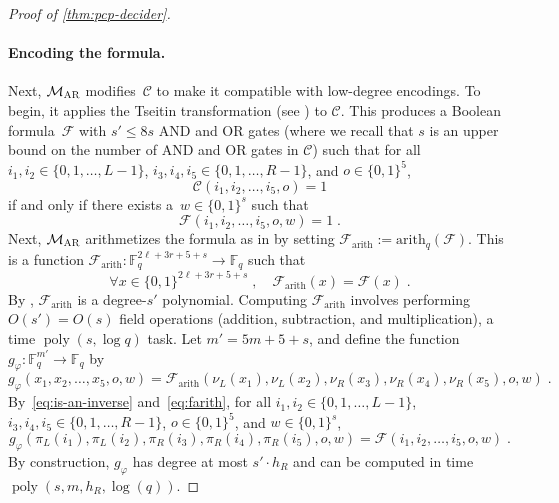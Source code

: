 \documentclass[11pt]{article}
\theoremstyle{definition}
\newcommand{\F}{\ensuremath{\mathbb{F}}}
\DeclareMathOperator{\poly}{poly}
\newcommand{\gamestyle}[1]{\ensuremath{\textsc{#1}}\xspace}
\newcommand{\ar}{\gamestyle{AR}}
\newcommand{\circuit}{\mathcal{C}}
\newcommand{\formula}{\mathcal{F}}
\newcommand{\pcpverifier}{\mathcal{M}_\ar}
\begin{document}
\begin{proof}[Proof of \cref{thm:pcp-decider}]
  \paragraph{Encoding the formula.}
  Next, $\pcpverifier$ modifies~$\circuit$ to make it compatible with low-degree
  encodings.
  To begin, it applies the Tseitin transformation (see
  \cite[Section~$3.8$]{NW19}) to $\circuit$.
  This produces a Boolean formula~$\formula$ with $s' \leq 8s$ AND and OR gates
  (where we recall that $s$ is an upper bound on the number of AND and OR gates
  in $\circuit$) such that for all $i_1, i_2 \in \{0, 1, \ldots, L-1\}$, $i_3, i_4,
  i_5 \in \{0, 1, \ldots, R-1\}$, and $o \in \{0, 1\}^5$,
  \begin{equation*}
    \circuit(i_1, i_2, \ldots, i_5, o) = 1
  \end{equation*}
  if and only if there exists a~$w \in \{0, 1\}^s$ such that
  \begin{equation*}
    \formula(i_1, i_2, \ldots, i_5, o, w) = 1\;.
  \end{equation*}
  Next, $\pcpverifier$ arithmetizes the formula as in \cite[Definition~$3.28$]{NW19}
  by setting $\formula_{\mathrm{arith}}:= \mathrm{arith}_q(\formula)$.
  This is a function $\formula_{\mathrm{arith}}:\F_q^{2\ell + 3r + 5 + s}\rightarrow \F_q$
  such that
  \begin{equation}
    \label{eq:farith}
    \forall x \in \{0, 1\}^{2\ell + 3r+5+s}\;,
    \quad \formula_{\mathrm{arith}}(x) = \formula(x)\;.
  \end{equation}
  By \cite[Proposition~$3.29$]{NW19}, $\formula_{\mathrm{arith}}$ is a
  degree-$s'$ polynomial.
  Computing $\formula_{\mathrm{arith}}$ involves performing $O(s') = O(s)$ field
  operations (addition, subtraction, and multiplication), a time $\poly(s, \log
  q)$ task.
  Let $m' = 5m+5+s$, and define the function $g_\varphi:\F_q^{m'} \rightarrow
  \F_q$ by
  \begin{equation}
    g_\varphi(x_1, x_2, \ldots, x_5, o, w)
    = \formula_{\mathrm{arith}}(\nu_L(x_1), \nu_L(x_2), \nu_R(x_3),
    \nu_R(x_4), \nu_R(x_5), o, w)\;. \label{eq:gphi-def}
  \end{equation}
  By~\eqref{eq:is-an-inverse} and~\eqref{eq:farith}, for all $i_1, i_2 \in \{0,
  1, \ldots, L-1\}$, $i_3, i_4, i_5 \in \{0, 1, \ldots, R-1\}$, $o \in \{0,
  1\}^5$, and $w \in \{0, 1\}^s$,
  \begin{equation}
    \label{eq:inverse-reverse}
    g_\varphi(\pi_L(i_1), \pi_L(i_2), \pi_R(i_3), \pi_R(i_4), \pi_R(i_5), o, w)
    = \formula(i_1, i_2, \ldots, i_5, o,w)\;.
  \end{equation}
  By construction, $g_\varphi$ has degree at most $s' \cdot h_R$ and can be
  computed in time~$\poly(s, m, h_R, \log(q))$.


\end{proof}
\end{document}
